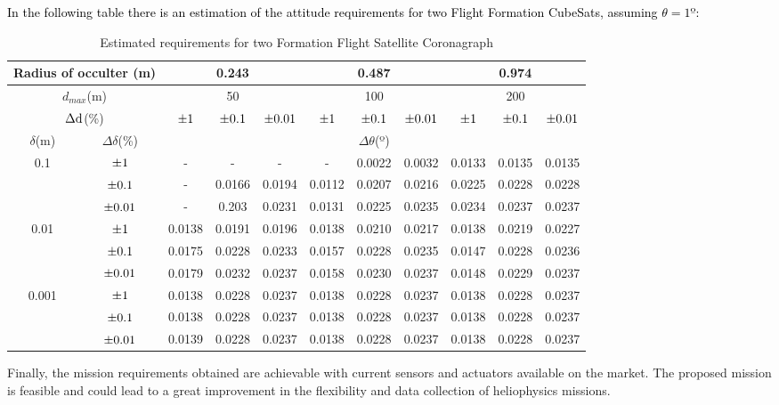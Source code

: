 \textcolor{black}{In the following table there is an estimation of
the attitude requirements for two Flight Formation CubeSats, assuming
$\theta=1\text{º}$:}

\begin{table}[H]
\centering{}%
\begin{tabular}{|c|c|c|c|c|c|c|c|c|c|c|}
\hline 
\multicolumn{2}{|c|}{Radius of occulter (m)} & \multicolumn{3}{c|}{0.243} & \multicolumn{3}{c|}{0.487} & \multicolumn{3}{c|}{0.974}\tabularnewline
\hline 
\multicolumn{2}{|c|}{$d_{max}$(m)} & \multicolumn{3}{c|}{50} & \multicolumn{3}{c|}{100} & \multicolumn{3}{c|}{200}\tabularnewline
\hline 
\multicolumn{2}{|c|}{$\text{\ensuremath{\Delta}d}$(\%)} & $\text{\textpm}1$ & $\text{\textpm}0.1$ & $\text{\textpm}0.01$ & $\text{\textpm}1$ & $\text{\textpm}0.1$ & $\text{\textpm}0.01$ & $\text{\textpm}1$ & $\text{\textpm}0.1$ & $\text{\textpm}0.01$\tabularnewline
\hline 
\hline 
$\delta$(m) & $\Delta\delta$(\%) & \multicolumn{9}{c|}{$\Delta\theta$(º)}\tabularnewline
\hline 
\multirow{3}{*}{0.1} & $\text{\textpm}1$ & - & - & - & - & 0.0022 & 0.0032 & 0.0133 & 0.0135 & 0.0135\tabularnewline
\cline{2-11} 
 & $\text{\textpm}0.1$ & - & 0.0166 & 0.0194 & 0.0112 & 0.0207 & 0.0216 & 0.0225 & 0.0228 & 0.0228\tabularnewline
\cline{2-11} 
 & $\text{\textpm}0.01$ & - & 0.203 & 0.0231 & 0.0131 & 0.0225 & 0.0235 & 0.0234 & 0.0237 & 0.0237\tabularnewline
\hline 
\multirow{3}{*}{0.01} & $\text{\textpm}1$ & 0.0138 & 0.0191 & 0.0196 & 0.0138 & 0.0210 & 0.0217 & 0.0138 & 0.0219 & 0.0227\tabularnewline
\cline{2-11} 
 & $\text{\textpm}0.1$ & 0.0175 & 0.0228 & 0.0233 & 0.0157 & 0.0228 & 0.0235 & 0.0147 & 0.0228 & 0.0236\tabularnewline
\cline{2-11} 
 & $\text{\textpm}0.01$ & 0.0179 & 0.0232 & 0.0237 & 0.0158 & 0.0230 & 0.0237 & 0.0148 & 0.0229 & 0.0237\tabularnewline
\hline 
\multirow{3}{*}{0.001} & $\text{\textpm}1$ & 0.0138 & 0.0228 & 0.0237 & 0.0138 & 0.0228 & 0.0237 & 0.0138 & 0.0228 & 0.0237\tabularnewline
\cline{2-11} 
 & $\text{\textpm}0.1$ & 0.0138 & 0.0228 & 0.0237 & 0.0138 & 0.0228 & 0.0237 & 0.0138 & 0.0228 & 0.0237\tabularnewline
\cline{2-11} 
 & $\text{\textpm}0.01$ & 0.0139 & 0.0228 & 0.0237 & 0.0138 & 0.0228 & 0.0237 & 0.0138 & 0.0228 & 0.0237\tabularnewline
\hline 
\end{tabular}\caption{Estimated requirements for two Formation Flight Satellite Coronagraph}
\end{table}


Finally, the mission requirements obtained are achievable with current
sensors and actuators available on the market. The proposed mission
is feasible and could lead to a great improvement in the flexibility
and data collection of heliophysics missions.


